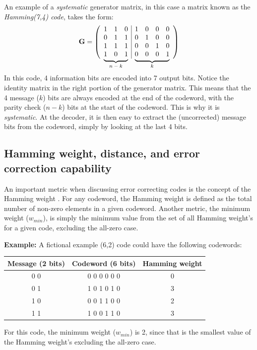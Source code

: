 \documentclass[11pt]{article}
\newcommand\undermat[2]{%
  \makebox[0pt][l]{$\smash{\underbrace{\phantom{%
    \begin{matrix}#2\end{matrix}}}_{\text{$#1$}}}$}#2}
\numberwithin{equation}{subsection}
\begin{document}
An example of a \textit{systematic} generator matrix, in this case a matrix known as the \textit{Hamming(7,4) code}, takes the form:
\begin{equation}
\mathbf{G} = 
\left(
\begin{array}{ccc|cccc}
  1 & 1 & 0 & 1 & 0 & 0 & 0 \\
  0 & 1 & 1 & 0 & 1 & 0 & 0 \\
  1 & 1 & 1 & 0 & 0 & 1 & 0 \\
  \undermat{n-k}{1 & 0 & 1} & \undermat{k}{0 & 0 & 0 & 1} \\
  \end{array}
\right)
\end{equation}
\\
In this code, 4 information bits are encoded into 7 output bits.
Notice the identity matrix in the right portion of the generator matrix. This means that the 4 message ($k$) bits are always encoded at the end of the codeword, with the parity check ($n-k$) bits at the start of the codeword. This is why it is \textit{systematic}. At the decoder, it is then easy to extract the (uncorrected) message bits from the codeword, simply by looking at the last 4 bits.

\subsection{Hamming weight, distance, and error correction capability}

An important metric when discussing error correcting codes is the concept of the Hamming weight \cite{coon15}. 
For any codeword, the Hamming weight is defined as the total number of non-zero elements in a given codeword. 
Another metric, the minimum weight ($w_{min}$), is simply the minimum value from the set of all Hamming weight's for a given code, excluding the all-zero case.

\textbf{Example:}
A fictional example (6,2) code could have the following codewords:

\begin{center}
\begin{tabular}{ c | c | c }
Message (2 bits) & Codeword (6 bits) & Hamming weight \\
\hline
0 0 & 0 0 0 0 0 0 & 0 \\
0 1 & 1 0 1 0 1 0 & 3 \\
1 0 & 0 0 1 1 0 0 & 2 \\
1 1 & 1 0 0 1 1 0 & 3 \\
\end{tabular}
\end{center}
For this code, the minimum weight ($w_{min}$) is 2, since that is the smallest value of the Hamming weight's excluding the all-zero case.
\end{document}
